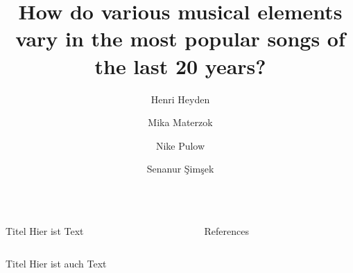 

\usepackage[orientation=portrait,size=a0,scale=1.4]{beamerposter}


\author[H. Heyden \and M. Materzok \and N. Pulow \and S. Şimşek]{Henri Heyden \and Mika Materzok \and Nike Pulow \and Senanur Şimşek}
\title{How do various musical elements vary in the most popular songs of the last 20 years?}



\begin{frame}{} 
\begin{columns}[]
    \begin{column}{.48\linewidth}
        \begin{block}{Titel}
            Hier ist Text
        \end{block}
    \end{column}
  
    \begin{column}{.48\linewidth}
    \begin{block}{References}
        \printbibliography
    \end{block}
    \end{column}
\end{columns}

\begin{block}{Titel}
    Hier ist auch Text
\end{block}
\end{frame}



